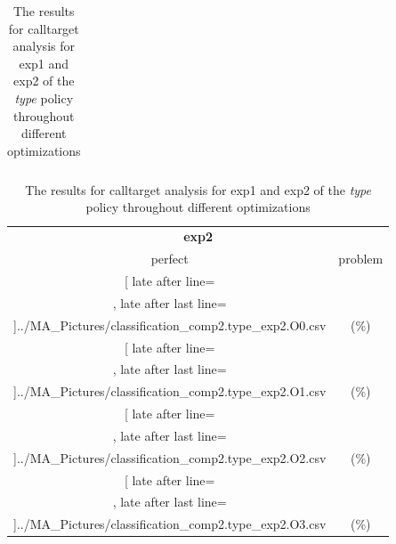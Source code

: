 \begin{table}[!htbp]
{\begin{tabular}{l|c|c|c}
    	\end{tabular}

	\begin{tabular}{|c|c}%

	\toprule
    \multicolumn{2}{c}{\bfseries exp2}\\
	
	     perfect &  problem %
	\\\midrule
	\csvreader[ late after line=\\, late after last line=\\\midrule]{../MA_Pictures/classification_comp2.type_exp2.O0.csv}{
}
	{\csvcolxiii (\csvcolxiv \%) & \csvcolxv (\csvcolxvi \%)}%
\multicolumn{1}{c}{}

	\\\midrule
	\csvreader[ late after line=\\, late after last line=\\\midrule]{../MA_Pictures/classification_comp2.type_exp2.O1.csv}{
}
	{\csvcolxiii (\csvcolxiv \%) & \csvcolxv (\csvcolxvi \%)}%
	
	\multicolumn{1}{c}{}

	\\\midrule
	\csvreader[ late after line=\\, late after last line=\\\midrule]{../MA_Pictures/classification_comp2.type_exp2.O2.csv}{
}
	{\csvcolxiii (\csvcolxiv \%) & \csvcolxv (\csvcolxvi \%)}%
	
\multicolumn{1}{c}{}
	\\\midrule
	\csvreader[ late after line=\\, late after last line=\\\bottomrule]{../MA_Pictures/classification_comp2.type_exp2.O3.csv}{
}
	{\csvcolxiii (\csvcolxiv \%) & \csvcolxv (\csvcolxvi \%)}%


    	\end{tabular}
}
		\caption {The results for calltarget analysis for exp1 and exp2 of the \textit{type} policy throughout different optimizations}
		\label{tbl:CTdestinterexp12TYPE}
\end{table}


